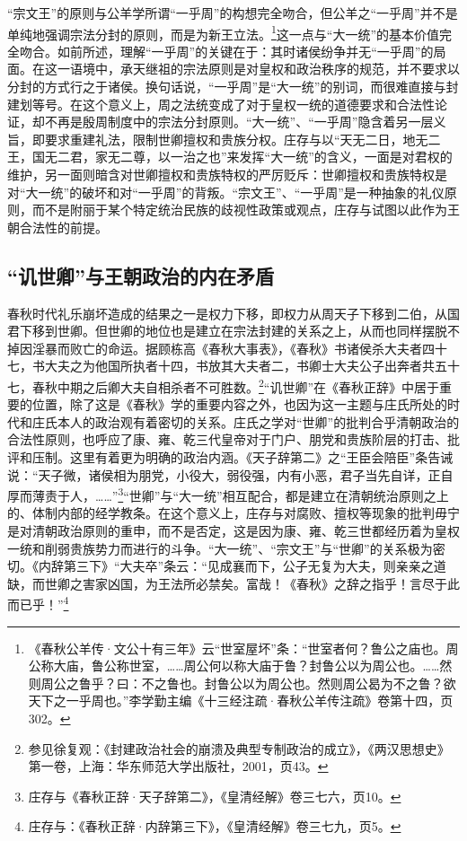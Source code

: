 \documentclass[a4paper, 12pt, openright]{ctexbook}
\begin{document}
“宗文王”的原则与公羊学所谓“一乎周”的构想完全吻合，但公羊之“一乎周”并不是单纯地强调宗法分封的原则，而是为新王立法。\footnote{《春秋公羊传·文公十有三年》云“世室屋坏”条：“世室者何？鲁公之庙也。周公称大庙，鲁公称世室，……周公何以称大庙于鲁？封鲁公以为周公也。……然则周公之鲁乎？曰：不之鲁也。封鲁公以为周公也。然则周公曷为不之鲁？欲天下之一乎周也。”李学勤主编《十三经注疏·春秋公羊传注疏》卷第十四，页302。}这一点与“大一统”的基本价值完全吻合。如前所述，理解“一乎周”的关键在于：其时诸侯纷争并无“一乎周”的局面。在这一语境中，承天继祖的宗法原则是对皇权和政治秩序的规范，并不要求以分封的方式行之于诸侯。换句话说，“一乎周”是“大一统”的别词，而很难直接与封建划等号。在这个意义上，周之法统变成了对于皇权一统的道德要求和合法性论证，却不再是殷周制度中的宗法分封原则。“大一统”、“一乎周”隐含着另一层义旨，即要求重建礼法，限制世卿擅权和贵族分权。庄存与以“天无二日，地无二王，国无二君，家无二尊，以一治之也”来发挥“大一统”的含义，一面是对君权的维护，另一面则暗含对世卿擅权和贵族特权的严厉贬斥：世卿擅权和贵族特权是对“大一统”的破坏和对“一乎周”的背叛。“宗文王”、“一乎周”是一种抽象的礼仪原则，而不是附丽于某个特定统治民族的歧视性政策或观点，庄存与试图以此作为王朝合法性的前提。

\subsection{“讥世卿”与王朝政治的内在矛盾}

春秋时代礼乐崩坏造成的结果之一是权力下移，即权力从周天子下移到二伯，从国君下移到世卿。但世卿的地位也是建立在宗法封建的关系之上，从而也同样摆脱不掉因淫暴而败亡的命运。据顾栋高《春秋大事表》，《春秋》书诸侯杀大夫者四十七，书大夫之为他国所执者十四，书放其大夫者二，书卿士大夫公子出奔者共五十七，春秋中期之后卿大夫自相杀者不可胜数。\footnote{参见徐复观：《封建政治社会的崩溃及典型专制政治的成立》，《两汉思想史》第一卷，上海：华东师范大学出版社，2001，页43。}“讥世卿”在《春秋正辞》中居于重要的位置，除了这是《春秋》学的重要内容之外，也因为这一主题与庄氏所处的时代和庄氏本人的政治观有着密切的关系。庄氏之学对“世卿”的批判合乎清朝政治的合法性原则，也呼应了康、雍、乾三代皇帝对于门户、朋党和贵族阶层的打击、批评和压制。这里有着更为明确的政治内涵。《天子辞第二》之“王臣会陪臣”条告诫说：“天子微，诸侯相为朋党，小役大，弱役强，内有小恶，君子当先自详，正自厚而薄责于人，……”\footnote{庄存与《春秋正辞·天子辞第二》，《皇清经解》卷三七六，页10。}“世卿”与“大一统”相互配合，都是建立在清朝统治原则之上的、体制内部的经学教条。在这个意义上，庄存与对腐败、擅权等现象的批判毋宁是对清朝政治原则的重申，而不是否定，这是因为康、雍、乾三世都经历着为皇权一统和削弱贵族势力而进行的斗争。“大一统”、“宗文王”与“世卿”的关系极为密切。《内辞第三下》“大夫卒”条云：“见成襄而下，公子无复为大夫，则亲亲之道缺，而世卿之害家凶国，为王法所必禁矣。富哉！《春秋》之辞之指乎！言尽于此而已乎！”\footnote{庄存与：《春秋正辞·内辞第三下》，《皇清经解》卷三七九，页5。}
\end{document}
